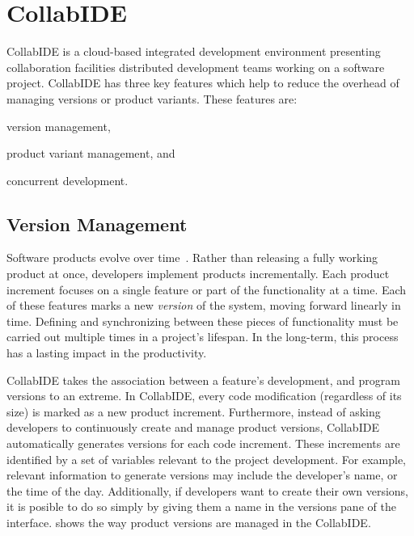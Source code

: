 
\section{CollabIDE}
\label{sec:collab-ide}

CollabIDE is a cloud-based integrated development environment presenting collaboration facilities 
distributed development teams working on a software project. CollabIDE has three key features which 
help to reduce the overhead of managing versions or product variants. These features are:
\begin{enumerate*}[label=(\arabic*)] 
\item version management, 
\item product variant management, and 
\item concurrent development.
\end{enumerate*}

\subsection{Version Management}
\label{sec:vcs}
Software products evolve over time~\cite{lehman02}. Rather than releasing a fully working product at 
once, developers implement products incrementally. Each product increment focuses on a single 
feature or part of the functionality at a time. Each of these features marks a new \emph{version} of the 
system, moving forward linearly in time. Defining and synchronizing between these pieces of 
functionality must be carried out multiple times in a project's lifespan. In the long-term, this process 
has a lasting impact in the productivity.

CollabIDE takes the association between a feature's development, and program versions to an 
extreme. In CollabIDE, every code modification (regardless of its size) is marked as a new product 
increment. Furthermore, instead of asking developers to continuously create and manage product 
versions, CollabIDE automatically generates versions for each code increment. These increments are 
identified by a set of variables relevant to the project development. For example, relevant information 
to generate versions may include the developer's name, or the time of the day. Additionally, if 
developers want to create their own versions, it is posible to do so simply by giving them a name in 
the versions pane of the interface.  shows the way product versions are 
managed in the CollabIDE. 

